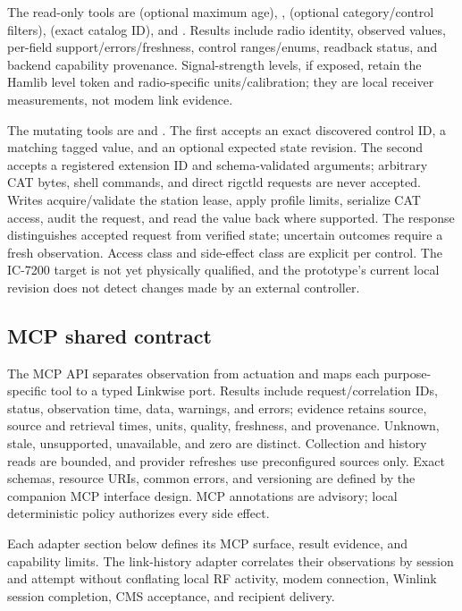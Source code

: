 \documentclass[11pt,a4paper]{article}
\begin{document}
The read-only tools are  (optional maximum age),
,  (optional
category/control filters),  (exact catalog ID), and
. Results include radio identity, observed values,
per-field support/errors/freshness, control ranges/enums, readback status,
and backend capability provenance. Signal-strength levels, if exposed, retain
the Hamlib level token and radio-specific units/calibration; they are local
receiver measurements, not modem link evidence.

The mutating tools are  and
. The first accepts an exact discovered control
ID, a matching tagged value, and an optional expected state revision. The
second accepts a registered extension ID and schema-validated arguments;
arbitrary CAT bytes, shell commands, and direct rigctld requests are never
accepted. Writes acquire/validate the station lease, apply profile limits,
serialize CAT access, audit the request, and read the value back where
supported. The response distinguishes accepted request from verified state;
uncertain outcomes require a fresh observation. Access class and side-effect
class are explicit per control. The IC-7200 target is not yet physically
qualified, and the prototype's current local revision does not detect
changes made by an external controller.

\subsection{MCP shared contract}
The MCP API separates observation from actuation and maps each purpose-specific
tool to a typed Linkwise port. Results include request/correlation IDs,
status, observation time, data, warnings, and errors; evidence retains source,
source and retrieval times, units, quality, freshness, and provenance.
Unknown, stale, unsupported, unavailable, and zero are distinct. Collection
and history reads are bounded, and provider refreshes use preconfigured
sources only. Exact schemas, resource URIs, common errors, and versioning are
defined by the companion MCP interface design. MCP annotations are advisory;
local deterministic policy authorizes every side effect.

Each adapter section below defines its MCP surface, result evidence, and
capability limits. The link-history adapter correlates their observations by
session and attempt without conflating local RF activity, modem connection,
Winlink session completion, CMS acceptance, and recipient delivery.
\end{document}
